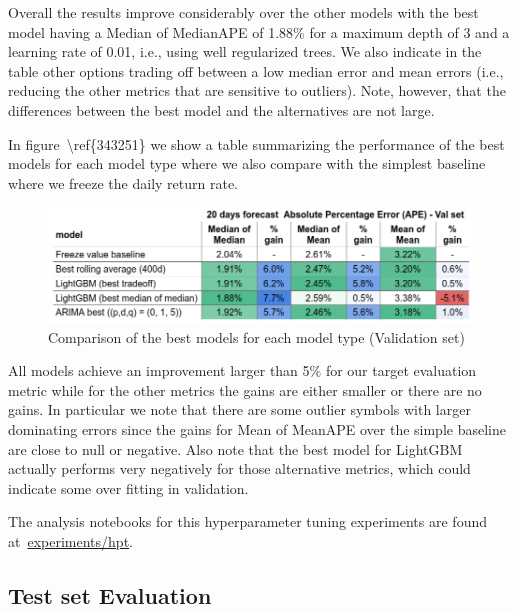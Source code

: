 \documentclass[10pt]{article}
\begin{document}
Overall the results improve considerably over the other models with the
best model having a Median of MedianAPE of 1.88\% for a maximum depth of
3 and a learning rate of 0.01, i.e., using well regularized trees. We
also indicate in the table other options trading off between a low
median error and mean errors (i.e., reducing the other metrics that are
sensitive to outliers). Note, however, that the differences between the
best model and the alternatives are not large.~

In figure~{\textbackslash ref\{343251\}} we show a table summarizing the
performance of the best models for each model type where we also compare
with the simplest baseline where we freeze the daily return rate.

\par\null{}
\begin{figure}[H]
\begin{center}
\includegraphics[width=0.84\columnwidth]{figures/screenshot71/screenshot71}
\caption{{Comparison of the best models for each model type (Validation set)
{\label{343251}}%
}}
\end{center}
\end{figure}

All models achieve an improvement larger than 5\% for our target
evaluation metric while for the other metrics the gains are either
smaller or there are no gains. In particular we note that there are some
outlier symbols with larger dominating errors since the gains for Mean
of MeanAPE over the simple baseline are close to null or negative. Also
note that the best model for LightGBM actually performs very negatively
for those alternative metrics, which could indicate some over fitting in
validation.~

The analysis notebooks for this hyperparameter tuning experiments are
found
at~\href{https://github.com/marcoopsampaio/aws_ml_eng_project_stock_prediction/tree/main/experiments/hpt}{experiments/hpt}.

\subsection{Test set Evaluation}
\end{document}
